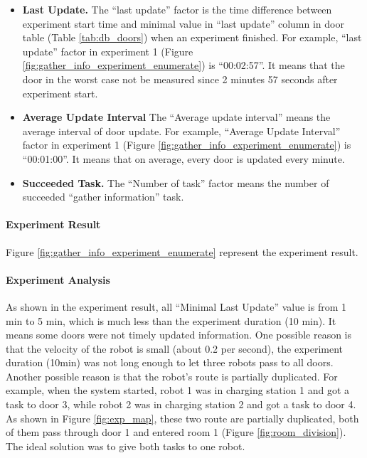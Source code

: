 \begin{itemize}
 \item \textbf{Last Update.} The ``last update'' factor is the time difference between experiment start time and minimal value in ``last update'' column in door table (Table \ref{tab:db_doors}) when an experiment finished. For example, ``last update'' factor in experiment 1 (Figure \ref{fig:gather_info_experiment_enumerate}) is ``00:02:57''. It means that the door in the worst case not be measured since 2 minutes 57 seconds after experiment start.
 \item \textbf{Average Update Interval} The ``Average update interval'' means the average interval of door update. For example, ``Average Update Interval'' factor in experiment 1 (Figure \ref{fig:gather_info_experiment_enumerate}) is ``00:01:00''. It means that on average, every door is updated every minute.
 \item \textbf{Succeeded Task.} The ``Number of task'' factor means the number of succeeded ``gather information'' task.
\end{itemize}

\paragraph{Experiment Result} 
Figure \ref{fig:gather_info_experiment_enumerate} represent the experiment result.

\paragraph{Experiment Analysis} 

As shown in the experiment result, all ``Minimal Last Update'' value is from 1 min to 5 min, which is much less than the experiment duration (10 min). It means some doors were not timely updated information. One possible reason is that the velocity of the robot is small (about 0.2 per second), the experiment duration (10min) was not long enough to let three robots pass to all doors. Another possible reason is that the robot's route is partially duplicated. For example, when the system started, robot 1 was in charging station 1 and got a task to door 3, while robot 2 was in charging station 2 and got a task to door 4. As shown in Figure \ref{fig:exp_map}, these two route are partially duplicated, both of them pass through door 1 and entered room 1 (Figure \ref{fig:room_division}). The ideal solution was to give both tasks to one robot. 

